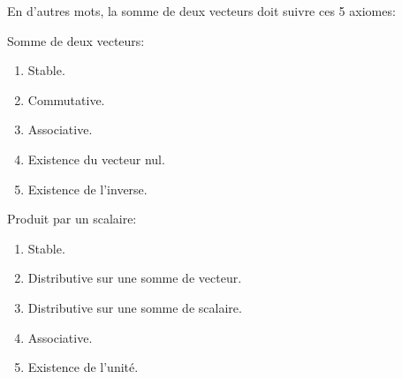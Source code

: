 \documentclass[a4paper]{article}
\begin{document}
{    En d'autres mots, la somme de deux vecteurs doit suivre ces 5 axiomes:

    \begin{center}
    \begin{minipage}[t]{0.45\textwidth}\vspace{0pt}
    Somme de deux vecteurs:
    \begin{enumerate}
        \item Stable.
        \item Commutative.
        \item Associative.
        \item Existence du vecteur nul.
        \item Existence de l'inverse.
    \end{enumerate}

    \end{minipage}
    \hfill
    \begin{minipage}[t]{0.45\textwidth}\vspace{0pt}
    Produit par un scalaire:
    \begin{enumerate}
        \item Stable.
        \item Distributive sur une somme de vecteur.
        \item Distributive sur une somme de scalaire.
        \item Associative.
        \item Existence de l'unité.
    \end{enumerate}

    \end{minipage}
    \end{center}
}


\end{document}
